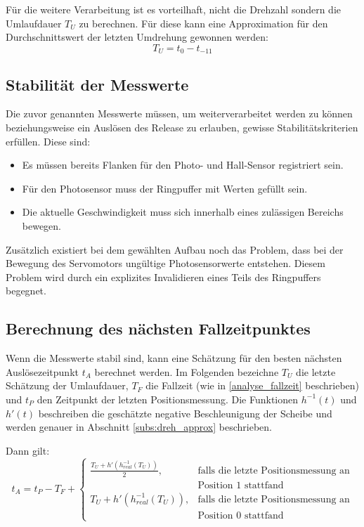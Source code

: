 Für die weitere Verarbeitung ist es vorteilhaft, nicht die Drehzahl sondern die Umlaufdauer $T_U$ zu berechnen.
Für diese kann eine Approximation für den Durchschnittswert der letzten Umdrehung gewonnen werden:
\begin{equation*}
T_U = t_0 - t_{-11}
\end{equation*}

\subsection{Stabilität der Messwerte}\label{design_stabilitaet}
Die zuvor genannten Messwerte müssen, um weiterverarbeitet werden zu können beziehungsweise ein Auslösen des Release zu erlauben, gewisse Stabilitätskriterien erfüllen.
Diese sind:
\begin{itemize}
	\item Es müssen bereits Flanken für den Photo- und Hall-Sensor registriert sein.
	\item Für den Photosensor muss der Ringpuffer mit Werten gefüllt sein.
	\item Die aktuelle Geschwindigkeit muss sich innerhalb eines zulässigen Bereichs bewegen.
\end{itemize}

Zusätzlich existiert bei dem gewählten Aufbau noch das Problem, dass bei der Bewegung des Servomotors ungültige Photosensorwerte entstehen.
Diesem Problem wird durch ein explizites Invalidieren eines Teils des Ringpuffers begegnet.

\subsection{Berechnung des nächsten Fallzeitpunktes}\label{design_zeitpunkt}
Wenn die Messwerte stabil sind, kann eine Schätzung für den besten nächsten Auslösezeitpunkt $t_A$ berechnet werden.
Im Folgenden bezeichne $T_U$ die letzte Schätzung der Umlaufdauer, $T_F$ die Fallzeit (wie in \cref{analyse_fallzeit} beschrieben) und $t_P$ den Zeitpunkt der letzten Positionsmessung.
Die Funktionen $h^{-1}(t)$ und $h'(t)$ beschreiben die geschätzte negative Beschleunigung der Scheibe und werden genauer in Abschnitt \ref{subs:dreh_approx} beschrieben.

Dann gilt:
\begin{equation*}
t_A = t_P - T_F +
\begin{cases}
	\frac{T_U + h'(h^{-1}_{real}(T_U))}{2} , & \text{falls die letzte Positionsmessung an}\\
	&  \text{Position 1 stattfand}\\
	T_U + h'(h^{-1}_{real}(T_U)), & \text{falls die letzte Positionsmessung an}\\
	&  \text{Position 0 stattfand}
\end{cases}
\end{equation*}

